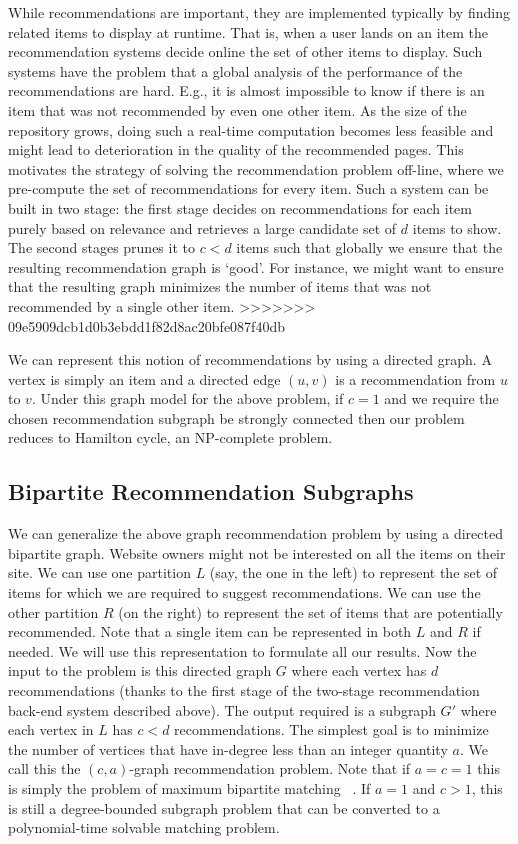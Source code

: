 While recommendations are important, they are implemented typically by finding
related items to display at runtime. That is, when a user lands on an item the
recommendation systems decide online the set of other items to display. Such
systems have the problem that a global analysis of the performance of the
recommendations are hard. E.g., it is almost impossible to know if there is an
item that was not recommended by even one other item. As the size of the
repository grows, doing such a real-time computation becomes less feasible and
might lead to deterioration in the quality of the recommended pages.  This
motivates the strategy of solving the recommendation problem off-line, where we
pre-compute the set of recommendations for every item. Such a system can be
built in two stage: the first stage decides on recommendations for each item
purely based on relevance and retrieves a large candidate set of $d$ items to
show. The second stages prunes it to $c < d$ items such that globally we ensure
that the resulting recommendation graph is `good'. For instance, we might want
to ensure that the resulting graph minimizes the number of items that was not
recommended by a single other item. \vs
>>>>>>> 09e5909dcb1d0b3ebdd1f82d8ac20bfe087f40db

We can represent this notion of recommendations by using a directed graph. A
vertex is simply an item and a directed edge $(u, v)$ is a recommendation from
$u$ to $v$. Under this graph model for the above problem, if $c=1$ and we
require the chosen recommendation subgraph be strongly connected then our
problem reduces to Hamilton cycle, an NP-complete problem. \vs

\subsection{Bipartite Recommendation Subgraphs}

We can generalize the above graph recommendation problem by using a directed
bipartite graph. Website owners might not be interested on all the items on
their site. We can use one partition $L$ (say, the one in the left) to represent
the set of items for which we are required  to suggest recommendations. We can
use the other partition $R$ (on the right) to represent the set of items that
are potentially recommended. Note that a single item can be represented in both
$L$ and $R$ if needed. We will use this representation to formulate all our
results. Now the input to the problem is this directed graph $G$ where each
vertex has $d$ recommendations (thanks to the first stage of the two-stage
recommendation back-end system described above). The output required is a
subgraph $G'$ where each vertex in $L$ has $c < d$ recommendations. The simplest
goal is to minimize the number of vertices that have in-degree less than an
integer quantity $a$. We call this the $(c, a)$-graph recommendation problem.
Note that if $a=c=1$ this is simply the problem of maximum bipartite matching
~\cite{LovaszPlummer}. If $a=1$ and $c > 1$, this is still a degree-bounded
subgraph problem that can be converted to a polynomial-time solvable matching
problem. \vs

